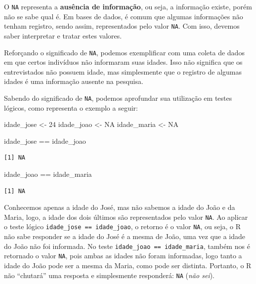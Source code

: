 \documentclass[
  brazilian,
]{book}
\newenvironment{Shaded}{\begin{snugshade}}{\end{snugshade}}
\newcommand{\ConstantTok}[1]{\textcolor[rgb]{0.00,0.00,0.00}{#1}}
\newcommand{\DecValTok}[1]{\textcolor[rgb]{0.00,0.00,0.81}{#1}}
\newcommand{\NormalTok}[1]{#1}
\newcommand{\OtherTok}[1]{\textcolor[rgb]{0.56,0.35,0.01}{#1}}
\newcommand{\SpecialCharTok}[1]{\textcolor[rgb]{0.00,0.00,0.00}{#1}}
\begin{document}
O \texttt{NA} representa a \textbf{ausência de informação}, ou seja, a informação existe, porém não se sabe qual é. Em bases de dados, é comum que algumas informações não tenham registro, sendo assim, representados pelo valor \texttt{NA}. Com isso, devemos saber interpretar e tratar estes valores.

Reforçando o significado de \texttt{NA}, podemos exemplificar com uma coleta de dados em que certos indivíduos não informaram suas idades. Isso não significa que os entrevistados não possuem idade, mas simplesmente que o registro de algumas idades é uma informação ausente na pesquisa.

Sabendo do significado de \texttt{NA}, podemos aprofundar sua utilização em testes lógicos, como representa o exemplo a seguir:

\begin{Shaded}
\begin{Highlighting}[]
\NormalTok{idade\_jose }\OtherTok{\textless{}{-}} \DecValTok{24}
\NormalTok{idade\_joao }\OtherTok{\textless{}{-}} \ConstantTok{NA}
\NormalTok{idade\_maria }\OtherTok{\textless{}{-}} \ConstantTok{NA}

\NormalTok{idade\_jose }\SpecialCharTok{==}\NormalTok{ idade\_joao}
\end{Highlighting}
\end{Shaded}

\begin{verbatim}
[1] NA
\end{verbatim}

\begin{Shaded}
\begin{Highlighting}[]
\NormalTok{idade\_joao }\SpecialCharTok{==}\NormalTok{ idade\_maria}
\end{Highlighting}
\end{Shaded}

\begin{verbatim}
[1] NA
\end{verbatim}

Conhecemos apenas a idade do José, mas não sabemos a idade do João e da Maria, logo, a idade dos dois últimos são representados pelo valor \texttt{NA}. Ao aplicar o teste lógico \texttt{idade\_jose\ ==\ idade\_joao}, o retorno é o valor \texttt{NA}, ou seja, o R não sabe responder se a idade do José é a mesma de João, uma vez que a idade do João não foi informada. No teste \texttt{idade\_joao\ ==\ idade\_maria}, também nos é retornado o valor \texttt{NA}, pois ambas as idades não foram informadas, logo tanto a idade do João pode ser a mesma da Maria, como pode ser distinta. Portanto, o R não ``chutará'' uma resposta e simplesmente responderá: \texttt{NA} (\emph{não sei}).
\end{document}
